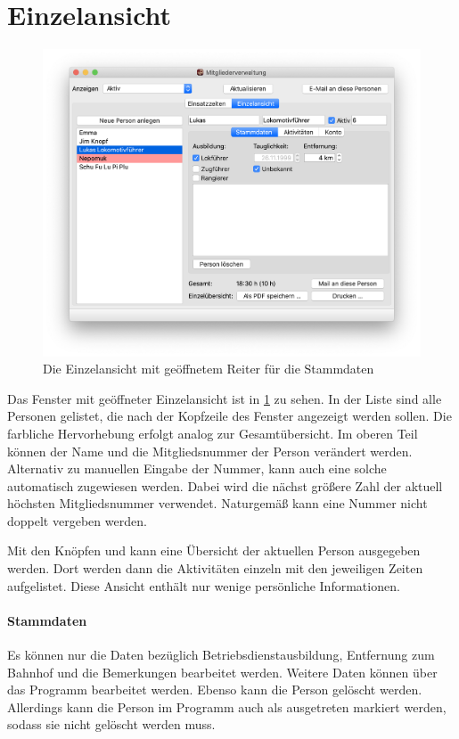 \section{Einzelansicht}\label{einsatz:personal:einzelansicht}
\begin{figure}[!h]
	\includegraphics[width=\textwidth]{img/einzelansicht_stammdaten}
	\caption{Die Einzelansicht mit geöffnetem Reiter für die Stammdaten}
	\label{fig:einsatz:personal:einzel:stammdaten}
\end{figure}
Das Fenster mit geöffneter Einzelansicht ist in \cref{fig:einsatz:personal:einzel:stammdaten} zu sehen.
In der Liste sind alle Personen gelistet, die nach der Kopfzeile des Fenster angezeigt werden sollen.
Die farbliche Hervorhebung erfolgt analog zur Gesamtübersicht.
Im oberen Teil können der Name und die Mitgliedsnummer der Person verändert werden.
Alternativ zu manuellen Eingabe der Nummer, kann auch eine solche automatisch zugewiesen werden.
Dabei wird die nächst größere Zahl der aktuell höchsten Mitgliedsnummer verwendet.
Naturgemäß kann eine Nummer nicht doppelt vergeben werden.

Mit den Knöpfen  und  kann eine Übersicht der aktuellen Person ausgegeben werden.
Dort werden dann die Aktivitäten einzeln mit den jeweiligen Zeiten aufgelistet.
Diese Ansicht enthält nur wenige persönliche Informationen.


\paragraph{Stammdaten}
Es können nur die Daten bezüglich Betriebsdienstausbildung, Entfernung zum Bahnhof und die Bemerkungen bearbeitet werden.
Weitere Daten können über das Programm \Personal bearbeitet werden.
Ebenso kann die Person gelöscht werden.
Allerdings kann die Person im Programm \Personal auch als ausgetreten markiert werden, sodass sie nicht gelöscht werden muss.

